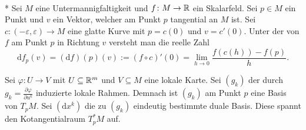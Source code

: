 \begin{definition}[Richtungsableitung]\mbox{}\\*
Sei $M$ eine Untermannigfaltigkeit und $f\colon M\to\mathbb R$ ein Skalarfeld.
Sei $p\in M$ ein Punkt und $v$ ein Vektor, welcher am Punkt $p$
tangential an $M$ ist. Sei $c\colon (-\varepsilon,\varepsilon)\to M$
eine glatte Kurve mit $p=c(0)$ und $v=c'(0)$. Unter der
 von $f$ am Punkt $p$ in Richtung $v$
versteht man die reelle Zahl
\begin{equation}
\mathrm df_p(v) = (\mathrm df)(p)(v) := (f\circ c)'(0)
= \lim_{h\to 0}\frac{f(c(h))-f(p)}{h}.
\end{equation}
\end{definition}
Sei $\varphi\colon U\to V$ mit $U\subseteq\mathbb R^m$ und $V\subseteq M$
eine lokale Karte. Sei $(g_k)$ der durch
$g_k=\frac{\partial\varphi}{\partial u^k}$ induzierte lokale
Rahmen. Demnach ist $(g_k)$ am Punkt $p$ eine
Basis von $T_p M$. Sei $(\mathrm dx^k)$ die zu $(g_k)$ eindeutig
bestimmte duale Basis. Diese spannt den Kotangentialraum $T_p^* M$ auf.


